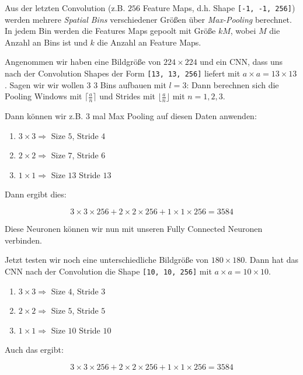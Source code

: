 \documentclass{scrartcl}
\begin{document}
Aus der letzten Convolution (z.B. $256$ Feature Maps, d.h. Shape \texttt{[-1, -1, 256]}) werden mehrere \emph{Spatial Bins} verschiedener Größen über \emph{Max-Pooling} berechnet.
In jedem Bin werden die Features Maps gepoolt mit Größe $kM$, wobei $M$ die Anzahl an Bins ist und $k$ die Anzahl an Feature Maps.

Angenommen wir haben eine Bildgröße von $224 \times 224$ und ein CNN, dass uns nach der Convolution Shapes der Form \texttt{[13, 13, 256]} liefert mit $a \times a = 13 \times 13$.
Sagen wir wir wollen $3$ 3 Bins aufbauen mit $l = 3$:
Dann berechnen sich die Pooling Windows mit $\lceil \frac{a}{n} \rceil$ und Strides mit $\lfloor \frac{a}{n} \rfloor$ mit $n = 1, 2, 3$.

Dann können wir z.B. 3 mal Max Pooling auf diesen Daten anwenden:

\begin{enumerate}
  \item $3 \times 3 \Rightarrow$ Size $5$, Stride $4$
  \item $2 \times 2 \Rightarrow$ Size $7$, Stride $6$
  \item $1 \times 1 \Rightarrow$ Size $13$ Stride $13$
\end{enumerate}

Dann ergibt dies:

\begin{equation}
  3 \times 3 \times 256 + 2 \times 2 \times 256 + 1 \times 1 \times 256 = 3584
\end{equation}

Diese Neuronen können wir nun mit unseren Fully Connected Neuronen verbinden.

Jetzt testen wir noch eine unterschiedliche Bildgröße von $180 \times 180$.
Dann hat das CNN nach der Convolution die Shape \texttt{[10, 10, 256]} mit $a \times a = 10 \times 10$.

\begin{enumerate}
  \item $3 \times 3 \Rightarrow$ Size $4$, Stride $3$
  \item $2 \times 2 \Rightarrow$ Size $5$, Stride $5$
  \item $1 \times 1 \Rightarrow$ Size $10$ Stride $10$
\end{enumerate}

Auch das ergibt:

\begin{equation}
  3 \times 3 \times 256 + 2 \times 2 \times 256 + 1 \times 1 \times 256 = 3584
\end{equation}
\end{document}
